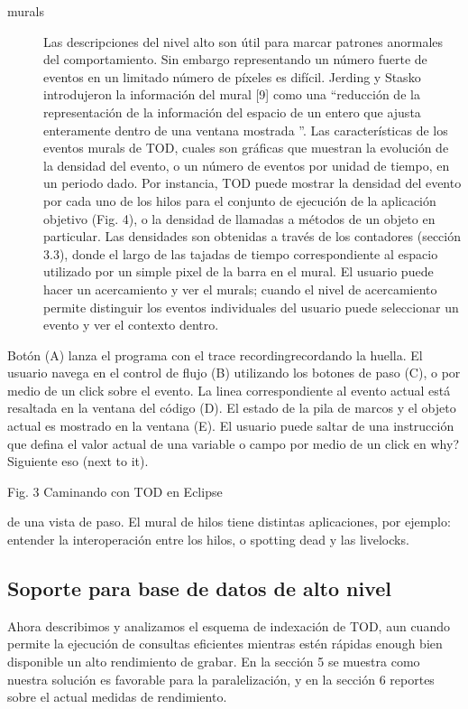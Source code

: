 \documentclass[12pt,a4paper]{report}
\begin{document}
\begin{description}
	\item[murals] Las descripciones del nivel alto son útil para marcar patrones anormales del comportamiento.  Sin embargo representando un número fuerte de eventos en un limitado número de píxeles es difícil.  Jerding y Stasko introdujeron la información del mural [9] como una “reducción de la representación de la información del espacio de un entero que ajusta enteramente dentro de una ventana mostrada ”.  Las características de los eventos murals de TOD, cuales son gráficas que muestran la evolución de la densidad del evento, o un número de eventos por unidad de tiempo, en un periodo dado.  Por instancia, TOD puede mostrar la densidad del evento por cada uno de los hilos para el conjunto de ejecución de la aplicación objetivo (Fig. 4), o la densidad de llamadas a métodos de un objeto en particular.  Las densidades son obtenidas a través  de los contadores (sección 3.3), donde el largo de las tajadas de tiempo correspondiente al espacio utilizado por un simple pixel de la barra en el mural.  El usuario puede hacer un acercamiento y ver el murals;  cuando el nivel de acercamiento permite distinguir los eventos individuales del usuario puede seleccionar un evento y ver el contexto dentro.
\end{description}

Botón (A) lanza el programa con el trace recording{recordando la huella}.  El usuario navega en el control de flujo (B) utilizando los botones de paso (C), o por medio de un click sobre el evento.  La linea correspondiente al evento actual está resaltada en la ventana del código (D).  El estado de la pila de marcos y el objeto actual es mostrado en la ventana (E).  El usuario puede saltar de una instrucción que defina el valor actual de una variable o campo por medio de un click en why? Siguiente eso (next to it).


Fig. 3 Caminando con TOD en Eclipse

de una vista de paso.  El mural de hilos tiene distintas aplicaciones, por ejemplo: entender la interoperación entre los hilos, o spotting dead y las livelocks.

		\subsection{Soporte para base de datos de alto nivel}

Ahora describimos y analizamos el esquema de indexación de TOD, aun cuando permite la ejecución de consultas eficientes mientras estén rápidas enough {bien} disponible un alto rendimiento de grabar.  En la sección 5 se muestra como nuestra solución es favorable para la paralelización, y en la sección 6 reportes sobre el actual medidas de rendimiento.
\end{document}
